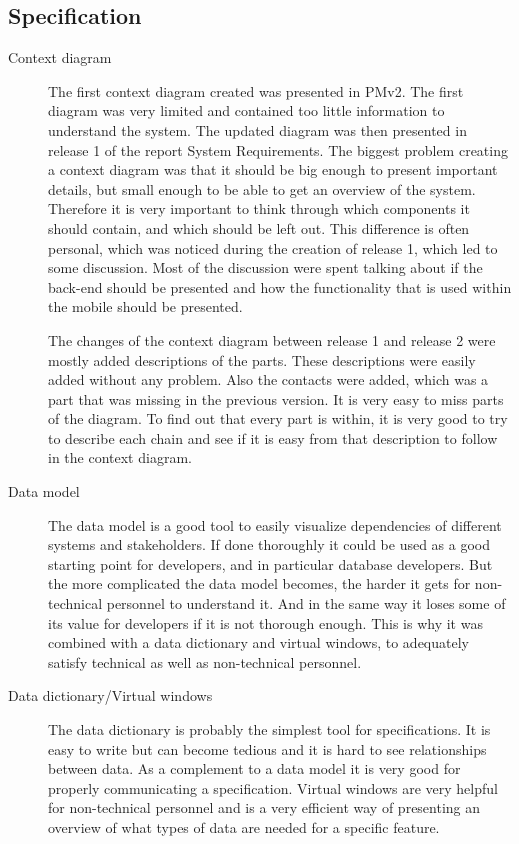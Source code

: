 \documentclass[10pt,a4paper]{article}
\begin{document}
\subsection{Specification}
\begin{description}
\item[Context diagram] The first context diagram created was presented in PMv2. The first diagram was very limited and contained too little information to understand the system. The updated diagram was then presented in release 1 of the report System Requirements. The biggest problem creating a context diagram was that it should be big enough to present important details, but small enough to be able to get an overview of the system. Therefore it is very important to think through which components it should contain, and which should be left out. This difference is often personal, which was noticed during the creation of release 1, which led to some discussion. Most of the discussion were spent talking about if the back-end should be presented and how the functionality that is used within the mobile should be presented. 

The changes of the context diagram between release 1 and release 2 were mostly added descriptions of the parts. These descriptions were easily added without any problem. Also the contacts were added, which was a part that was missing in the previous version. It is very easy to miss parts of the diagram. To find out that every part is within, it is very good to try to describe each chain and see if it is easy from that description to follow in the context diagram. 

\item[Data model] The data model is a good tool to easily visualize dependencies of different systems and stakeholders. If done  thoroughly it could be used as a good starting point for developers, and in particular database developers. But the more complicated the data model becomes, the harder it gets for non-technical personnel to understand it. And in the same way it loses some of its value for developers if it is not thorough enough. This is why it was combined with  a data dictionary and virtual windows, to adequately satisfy technical as well as non-technical personnel. 

\item[Data dictionary/Virtual windows] The data dictionary is probably the simplest tool for specifications. It is easy to write but can become tedious and it is hard to see relationships between data. As a complement to a data model it is very good for properly communicating a specification. Virtual windows are very helpful for non-technical personnel and is a very efficient way of presenting an overview of what types of data are needed for a specific feature. 


\end{description}
\end{document}
